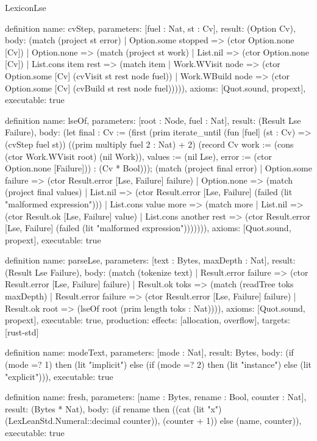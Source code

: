 \begin{lexlean}{LexiconLse}
\begin{semanticmodule}
definition{
  name: cvStep,
  parameters: [fuel : Nat, st : Cv],
  result: (Option Cv),
  body: (match (project st error)
    | Option.some stopped => (ctor Option.none [Cv])
    | Option.none => (match (project st work)
      | List.nil => (ctor Option.none [Cv])
      | List.cons item rest => (match item
        | Work.WVisit node => (ctor Option.some [Cv] (cvVisit st rest node fuel))
        | Work.WBuild node => (ctor Option.some [Cv] (cvBuild st rest node fuel))))),
  axioms: [Quot.sound, propext],
  executable: true
}

definition{
  name: lseOf,
  parameters: [root : Node, fuel : Nat],
  result: (Result Lse Failure),
  body: (let final : Cv := (first (prim iterate_until (fun [fuel] (st : Cv) => (cvStep fuel st)) ((prim multiply fuel 2 : Nat) + 2) (record Cv {work := (cons (ctor Work.WVisit root) (nil Work)), values := (nil Lse), error := (ctor Option.none [Failure])}) : (Cv * Bool))); (match (project final error)
    | Option.some failure => (ctor Result.error [Lse, Failure] failure)
    | Option.none => (match (project final values)
      | List.nil => (ctor Result.error [Lse, Failure] (failed (lit "malformed expression")))
      | List.cons value more => (match more
        | List.nil => (ctor Result.ok [Lse, Failure] value)
        | List.cons another rest => (ctor Result.error [Lse, Failure] (failed (lit "malformed expression"))))))),
  axioms: [Quot.sound, propext],
  executable: true
}

definition{
  name: parseLse,
  parameters: [text : Bytes, maxDepth : Nat],
  result: (Result Lse Failure),
  body: (match (tokenize text)
    | Result.error failure => (ctor Result.error [Lse, Failure] failure)
    | Result.ok toks => (match (readTree toks maxDepth)
      | Result.error failure => (ctor Result.error [Lse, Failure] failure)
      | Result.ok root => (lseOf root (prim length toks : Nat)))),
  axioms: [Quot.sound, propext],
  executable: true,
  production: {effects: [allocation, overflow], targets: [rust-std]}
}

definition{
  name: modeText,
  parameters: [mode : Nat],
  result: Bytes,
  body: (if (mode =? 1) then (lit "implicit") else (if (mode =? 2) then (lit "instance") else (lit "explicit"))),
  executable: true
}

definition{
  name: fresh,
  parameters: [name : Bytes, rename : Bool, counter : Nat],
  result: (Bytes * Nat),
  body: (if rename then ((cat (lit "x") (LexLeanStd.Numeral::decimal counter)), (counter + 1)) else (name, counter)),
  executable: true
}


\end{semanticmodule}
\end{lexlean}
